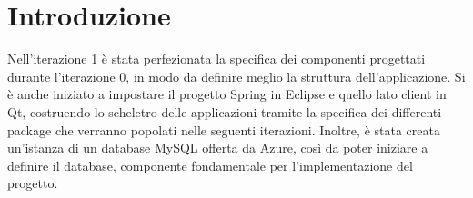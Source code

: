 \section{Introduzione}
Nell'iterazione 1 è stata perfezionata la specifica dei componenti progettati durante l'iterazione 0, in modo da definire meglio la struttura dell'applicazione. Si è anche iniziato a impostare il progetto Spring in Eclipse e quello lato client in Qt, costruendo lo scheletro delle applicazioni tramite la specifica dei differenti package che verranno popolati nelle seguenti iterazioni. Inoltre, è stata creata un'istanza di un database MySQL offerta da Azure, così da poter iniziare a definire il database, componente fondamentale per l'implementazione del progetto.